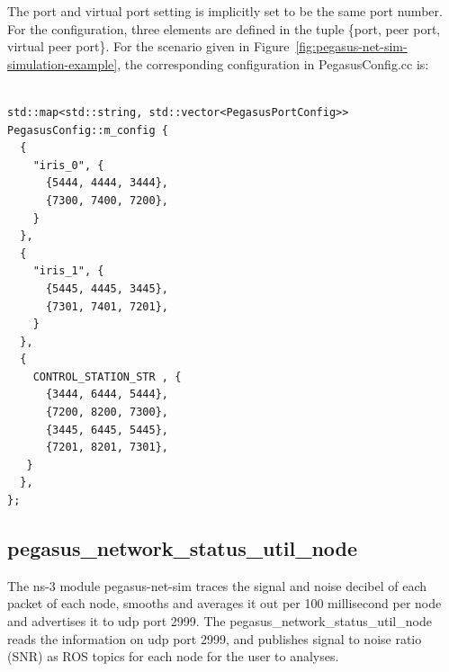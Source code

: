 The port and virtual port setting is implicitly set to be the same port number. For the configuration, three elements are defined in the tuple \{port, peer port, virtual peer port\}. For the scenario given in Figure~\ref{fig:pegasus-net-sim-simulation-example}, the corresponding configuration in PegasusConfig.cc is:

\begin{verbatim}

std::map<std::string, std::vector<PegasusPortConfig>> 
PegasusConfig::m_config {
  {
    "iris_0", {
      {5444, 4444, 3444},
      {7300, 7400, 7200},
    }
  },
  {
    "iris_1", {
      {5445, 4445, 3445},
      {7301, 7401, 7201},
    }
  },
  {
    CONTROL_STATION_STR , {
      {3444, 6444, 5444},
      {7200, 8200, 7300},
      {3445, 6445, 5445},
      {7201, 8201, 7301},
   }
  },
};
\end{verbatim}

\subsection{pegasus\_network\_status\_util\_node}

The ns-3 module pegasus-net-sim traces the signal and noise decibel of each packet of each node, smooths and averages it out per 100 millisecond per node and advertises it to udp port 2999. The pegasus\_network\_status\_util\_node reads the information on udp port 2999, and publishes signal to noise ratio (SNR) as ROS topics for each node for the user to analyses. 

